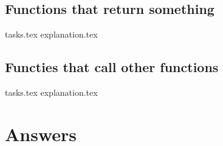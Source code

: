 
    \section{Functions that return something}
    {tasks.tex}            \newpage
    {explanation.tex}         \newpage

    \section{Functies that call other functions}
    {tasks.tex}             \newpage
    {explanation.tex}          \newpage

    \chapter*{Answers}
    \printsolutions[headings-template=collection]



